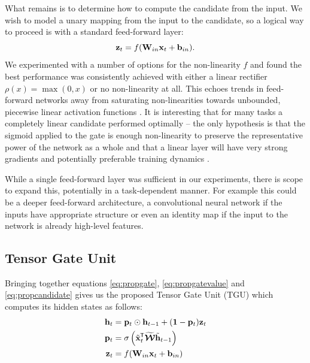 What remains is to determine how to compute the candidate from the input. We wish to model a unary
mapping from the input to the candidate, so a logical way to proceed is with a standard feed-forward
layer:
\begin{equation}\label{eq:propcandidate}
	\mathbf{z}_t = f(\mathbf{W}_{in}\mathbf{x}_t + \mathbf{b}_{in}).
\end{equation} We experimented with a number of options for the non-linearity \(f\) and found the best
performance was consistently achieved with either a linear rectifier \(\rho(x) = \max(0, x)\) or no
non-linearity at all. This echoes trends in feed-forward networks away from saturating non-linearities
towards unbounded, piecewise linear activation functions \autocite{Goodfellow2013, He}. It is
interesting that for many tasks a completely linear candidate performed optimally -- the only hypothesis
is that the sigmoid applied to the gate is enough non-linearity to preserve the representative power of
the network as a whole and that a linear layer will have very strong gradients and potentially
preferable training dynamics \autocite{Saxe2013}.

While a single feed-forward layer was sufficient in our experiments, there is scope to expand this,
potentially in a task-dependent manner. For example this could be a deeper feed-forward architecture,
a convolutional neural network if the inputs have appropriate structure or even an identity map if the
input to the network is already high-level features.

\subsection{Tensor Gate Unit}
Bringing together equations \eqref{eq:propgate}, \eqref{eq:propgatevalue} and \eqref{eq:propcandidate}
gives us the proposed Tensor Gate Unit (TGU) which computes its hidden states as follows:
\begin{align}\label{eq:tgu}
	\mathbf{h}_t &= \mathbf{p}_t \odot \mathbf{h}_{t-1} + (\mathbf{1}-\mathbf{p}_t)\mathbf{z}_t \\
	\mathbf{p}_t &= \sigma\left(\tilde{\mathbf{x}}^{\mkern-1.5mu\mathsf{T}}_t\widetilde{\bm{\mathcal{W}}}\tilde{\mathbf{h}}_{t-1} \right)\\
	\mathbf{z}_t &= f(\mathbf{W}_{in}\mathbf{x}_t + \mathbf{b}_{in})
\end{align}


